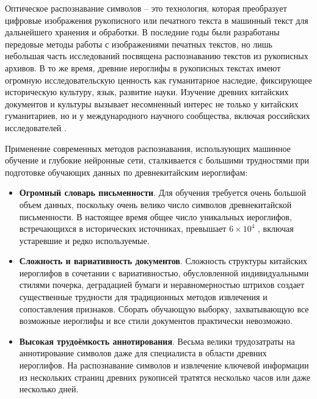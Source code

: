 
{\actuality}
Оптическое распознавание символов – это технология, которая преобразует цифровые изображения рукописного или печатного текста в машинный текст для дальнейшего хранения и обработки. В последние годы были разработаны передовые методы работы с изображениями печатных текстов, но лишь небольшая часть исследований посвящена распознаванию текстов из рукописных архивов. В то же время, древние иероглифы в рукописных текстах имеют огромную исследовательскую ценность как гуманитарное наследие, фиксирующее историческую культуру, язык, развитие науки. Изучение древних китайских документов и культуры вызывает несомненный интерес не только у китайских гуманитариев, но и у международного научного сообщества, включая российских исследователей \cite{yumasheva2023automated, кобзев2002философия, кобзев2011великое}.

Применение современных методов распознавания, использующих машинное обучение и глубокие нейронные сети, сталкивается с большими трудностями при подготовке обучающих данных по древнекитайским иероглифам:

\begin{itemize}[label=•]
    \item \textbf{Огромный словарь письменности}. Для обучения требуется очень большой объем данных, поскольку очень велико число символов древнекитайской письменности. В настоящее время общее число уникальных иероглифов, встречающихся в исторических источниках, превышает $6\times 10^4$ \cite{xu1986hanyudazidian}, включая устаревшие и редко используемые.
    \item \textbf{Сложность и вариативность документов}. Сложность структуры китайских иероглифов в сочетании с вариативностью, обусловленной индивидуальными стилями почерка, деградацией бумаги и неравномерностью штрихов создает существенные трудности для традиционных методов извлечения и сопоставления признаков. Сборать обучающую выборку, захватывающую все возможные иероглифы и все стили документов практически невозможно.
    \item \textbf{Высокая трудоёмкость аннотирования}. Весьма велики трудозатраты на аннотирование символов даже для специалиста в области древних иероглифов. На распознавание символов и извлечение ключевой информации из нескольких страниц древних рукописей тратятся несколько часов или даже несколько дней.
\end{itemize}

